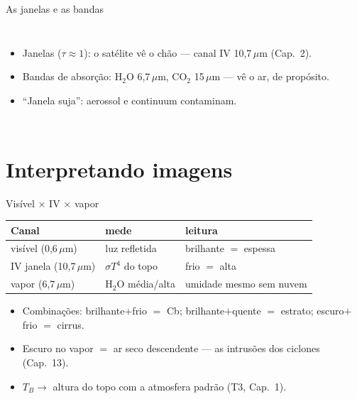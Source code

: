 \documentclass[aspectratio=169,11pt]{beamer}
\begin{document}
\begin{frame}{As janelas e as bandas}
  \begin{columns}
    \begin{itemize}
      \item Janelas ($\tau \approx 1$): o satélite vê o chão — canal
            IV 10{,}7\,$\mu$m (Cap.~2).
      \item Bandas de absorção: H$_2$O 6{,}7\,$\mu$m, CO$_2$
            15\,$\mu$m — vê o \alert{ar}, de propósito.
      \item ``Janela suja'': aerossol e continuum contaminam.
    \end{itemize}
  \end{columns}
\end{frame}

\section{Interpretando imagens}

\begin{frame}{Visível × IV × vapor}
  \centering
  \begin{tabular}{lll}
    \hline
    Canal & mede & leitura \\
    \hline
    visível (0{,}6\,$\mu$m) & luz refletida & \alert{brilhante $=$
    espessa} \\
    IV janela (10{,}7\,$\mu$m) & $\sigma T^4$ do topo & \alert{frio $=$
    alta} \\
    vapor (6{,}7\,$\mu$m) & H$_2$O média/alta & umidade mesmo sem nuvem \\
    \hline
  \end{tabular}
  \vspace{0.6em}
  \begin{itemize}
    \item Combinações: brilhante$+$frio $=$ Cb; brilhante$+$quente $=$
          estrato; escuro$+$frio $=$ cirrus.
    \item Escuro no vapor $=$ ar seco descendente — as intrusões dos
          ciclones (Cap.~13).
    \item $T_B \to$ altura do topo com a atmosfera padrão (T3, Cap.~1).
  \end{itemize}
\end{frame}
\end{document}

